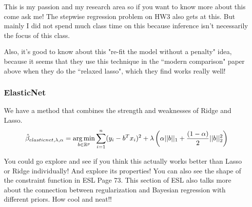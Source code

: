 This is my passion and my research area so if you want to know more about this come ask me! The stepwise regression problem on HW3 also gets at this. But mainly I did not spend much class time on this because inference isn't necessarily the focus of this class. 

Also, it's good to know about this "re-fit the model without a penalty" idea, because it seems that they use this technique in the ``modern comparison" paper above when they do the ``relaxed lasso", which they find works really well! 
\subsubsection{ElasticNet}

We have a method that combines the strength and weaknesses of Ridge and Lasso. 
\begin{equation}
\label{subset}
\hat{\beta}_{elasticnet,\lambda, \alpha} = \mathop{\mathrm{arg\,min}}_{b \in \mathbb{R}^p} \sum_{i=1}^n 	(y_i - b^T x_i)^2 + \lambda \left( \alpha ||b||_1 + \frac{(1-\alpha)}{2}||b||^2_2\right) 
\end{equation}

You could go explore and see if you think this actually works better than Lasso or Ridge individually! And explore its properties! You can also see the shape of the constraint function in ESL Page 73. This section of ESL also talks more about the connection between regularization and Bayesian regression with different priors. How cool and neat!! 

